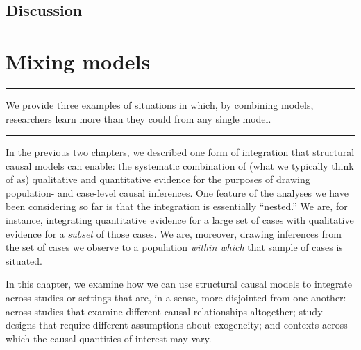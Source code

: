 \documentclass[
  12pt,
]{book}
\begin{document}
\hypertarget{discussion}{%
\section{Discussion}\label{discussion}}

\hypertarget{mm}{%
\chapter{Mixing models}\label{mm}}

\begin{center}\rule{0.5\linewidth}{0.5pt}\end{center}

We provide three examples of situations in which, by combining models, researchers learn more than they could from any single model.

\begin{center}\rule{0.5\linewidth}{0.5pt}\end{center}

In the previous two chapters, we described one form of integration that structural causal models can enable: the systematic combination of (what we typically think of as) qualitative and quantitative evidence for the purposes of drawing population- and case-level causal inferences. One feature of the analyses we have been considering so far is that the integration is essentially ``nested.'' We are, for instance, integrating quantitative evidence for a large set of cases with qualitative evidence for a \emph{subset} of those cases. We are, moreover, drawing inferences from the set of cases we observe to a population \emph{within which} that sample of cases is situated.

In this chapter, we examine how we can use structural causal models to integrate across studies or settings that are, in a sense, more disjointed from one another: across studies that examine different causal relationships altogether; study designs that require different assumptions about exogeneity; and contexts across which the causal quantities of interest may vary.
\end{document}
